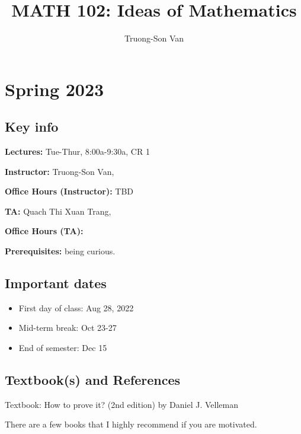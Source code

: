 \documentclass[
]{article}
\title{MATH 102: Ideas of Mathematics}
\author{Truong-Son Van}
\date{}
\providecommand{\tightlist}{%
  \setlength{\itemsep}{0pt}\setlength{\parskip}{0pt}}
\begin{document}
\maketitle

{
\setcounter{tocdepth}{2}
\tableofcontents
}
\hypertarget{spring-2023}{%
\section*{Spring 2023}\label{spring-2023}}

\hypertarget{key-info}{%
\subsection*{Key info}\label{key-info}}

\textbf{Lectures:} Tue-Thur, 8:00a-9:30a, CR 1

\textbf{Instructor:} Truong-Son Van,

\textbf{Office Hours (Instructor):} TBD

\textbf{TA:} Quach Thi Xuan Trang,

\textbf{Office Hours (TA):}

\textbf{Prerequisites:} being curious.

\hypertarget{important-dates}{%
\subsection*{Important dates}\label{important-dates}}

\begin{itemize}
\tightlist
\item
  First day of class: Aug 28, 2022
\item
  Mid-term break: Oct 23-27
\item
  End of semester: Dec 15
\end{itemize}

\hypertarget{textbooks-and-references}{%
\subsection*{Textbook(s) and References}\label{textbooks-and-references}}

Textbook: How to prove it? (2nd edition) by Daniel J. Velleman

There are a few books that I highly recommend if you are motivated.
\end{document}
